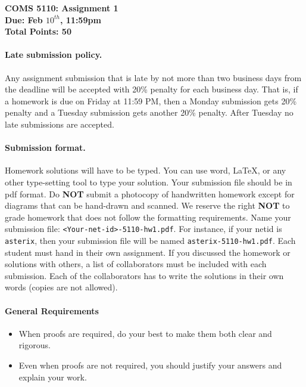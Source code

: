 \documentclass[12pt]{article}
\date{}
\begin{document}
\begin{center}
  \textbf{COMS 5110: Assignment 1}\\
  \textbf{Due: Feb $10^{th}$, 11:59pm}\\
  \textbf{Total Points: 50}
\end{center}


\paragraph{Late submission policy.\ }
Any assignment submission that is late by not more than two business days from the deadline will be accepted with 20\% penalty for each business day. That is, if a homework is due on Friday at 11:59 PM, then a Monday submission gets 20\% penalty and a Tuesday submission gets another 20\% penalty.  After Tuesday no late submissions are accepted.

\paragraph{Submission format.\ }
Homework solutions will have to be typed. You can use word, LaTeX, or any other type-setting tool to type your solution. Your submission file should be in pdf format. Do \textbf{NOT} submit a photocopy of handwritten homework except for diagrams that can be hand-drawn and scanned. We reserve the right \textbf{NOT} to grade homework that does not follow the formatting requirements.
Name your submission
file: \texttt{<Your-net-id>-5110-hw1.pdf}. For instance, if your netid
is \texttt{asterix}, then your submission file will be named
\texttt{asterix-5110-hw1.pdf}.
Each student must hand in their own assignment. If you discussed the homework or solutions with others, a list of collaborators must be included with each submission. Each of the collaborators has to write the solutions in their own words (copies are not allowed).

\paragraph{General Requirements}
\begin{itemize}
    \item When proofs are required, do your best to make them both clear and rigorous.
    \item Even when proofs are not required, you should justify your answers and explain your work.
\end{itemize}
\end{document}
